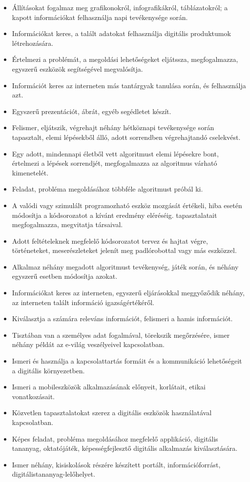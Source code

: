 \begin{itemize}
\item
  Állításokat fogalmaz meg grafikonokról, infografikákról,
  táblázatokról; a kapott információkat felhasználja napi tevékenysége
  során.
\item
  Információkat keres, a talált adatokat felhasználja digitális
  produktumok létrehozására.
\item
  Értelmezi a problémát, a megoldási lehetőségeket eljátssza,
  megfogalmazza, egyszerű eszközök segítségével megvalósítja.
\item
  Információt keres az interneten más tantárgyak tanulása során, és
  felhasználja azt.
\item
  Egyszerű prezentációt, ábrát, egyéb segédletet készít.
\item
  Felismer, eljátszik, végrehajt néhány hétköznapi tevékenysége során
  tapasztalt, elemi lépésekből álló, adott sorrendben végrehajtandó
  cselekvést.
\item
  Egy adott, mindennapi életből vett algoritmust elemi lépésekre bont,
  értelmezi a lépések sorrendjét, megfogalmazza az algoritmus várható
  kimenetelét.
\item
  Feladat, probléma megoldásához többféle algoritmust próbál ki.
\item
  A valódi vagy szimulált programozható eszköz mozgását értékeli, hiba
  esetén módosítja a kódsorozatot a kívánt eredmény eléréséig.
  tapasztalatait megfogalmazza, megvitatja társaival.
\item
  Adott feltételeknek megfelelő kódsorozatot tervez és hajtat végre,
  történeteket, meserészleteket jelenít meg padlórobottal vagy más
  eszközzel.
\item
  Alkalmaz néhány megadott algoritmust tevékenység, játék során, és
  néhány egyszerű esetben módosítja azokat.
\item
  Információkat keres az interneten, egyszerű eljárásokkal meggyőződik
  néhány, az interneten talált információ igazságértékéről.
\item
  Kiválasztja a számára releváns információt, felismeri a hamis
  információt.
\item
  Tisztában van a személyes adat fogalmával, törekszik megőrzésére,
  ismer néhány példát az e-világ veszélyeivel kapcsolatban.
\item
  Ismeri és használja a kapcsolattartás formáit és a kommunikáció
  lehetőségeit a digitális környezetben.
\item
  Ismeri a mobileszközök alkalmazásának előnyeit, korlátait, etikai
  vonatkozásait.
\item
  Közvetlen tapasztalatokat szerez a digitális eszközök használatával
  kapcsolatban.
\item
  Képes feladat, probléma megoldásához megfelelő applikáció, digitális
  tananyag, oktatójáték, képességfejlesztő digitális alkalmazás
  kiválasztására.
\item
  Ismer néhány, kisiskolások részére készített portált,
  információforrást, digitálistananyag-lelőhelyet.
\end{itemize}

